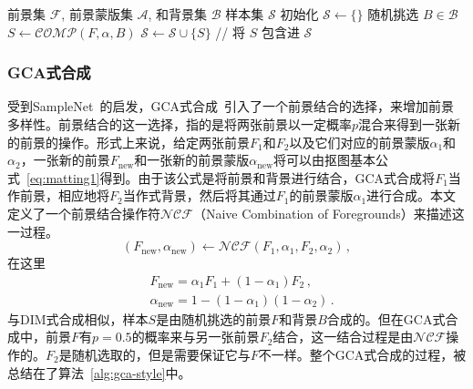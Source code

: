 \documentclass[supercite]{HustGraduPaper}
\begin{document}
	\begin{algorithm}[!t]
		\caption{DIM式合成} 
		\label{alg:dim-style} 
		\begin{algorithmic}
		\REQUIRE 前景集 $\mathcal{F}$, 前景蒙版集 $\mathcal{A}$, 和背景集 $\mathcal{B}$
		\ENSURE 样本集 $\mathcal{S}$
		\STATE 初始化 $\mathcal{S}\leftarrow\{\}$
			\STATE 随机挑选 $B\in\mathcal{B}$
			\STATE $S\leftarrow \mathcal{COMP}(F,\alpha,B)$
			\STATE $\mathcal{S}\leftarrow \mathcal{S} \cup \{S\}$ \textcolor{mygreen}{// 将 $S$ 包含进 $\mathcal{S}$}
			\ENDFOR
		\ENDFOR
		\end{algorithmic}
	\end{algorithm}
	
	\subsubsection{GCA式合成}
	受到SampleNet~\cite{LBSampling}的启发，GCA式合成~\cite{GCA}引入了一个前景结合的选择，来增加前景多样性。前景结合的这一选择，指的是将两张前景以一定概率$p$混合来得到一张新的前景的操作。形式上来说，给定两张前景$F_1$和$F_2$以及它们对应的前景蒙版$\alpha_1$和$\alpha_2$，一张新的前景$F_{\mathrm{new}}$和一张新的前景蒙版$\alpha_\mathrm{{new}}$将可以由抠图基本公式~\ref{eq:matting1}得到。由于该公式是将前景和背景进行结合，GCA式合成将$F_1$当作前景，相应地将$F_2$当作式背景，然后将其通过$F_1$的前景蒙版$\alpha_1$进行合成。本文定义了一个前景结合操作符$\mathcal{NCF}$（Naive Combination of Foregrounds）来描述这一过程。
	\begin{equation}
		(F_{\mathrm{new}},\alpha_{\mathrm{new}})\leftarrow\mathcal{NCF}(F_1,\alpha_1,F_2,\alpha_2)\,,
	\end{equation}
	在这里
	\begin{align}
		\label{eq:f_new_gca}
		&F_{\mathrm{new }}=\alpha_{1}F_1 + (1-\alpha_{1})F_2\,,\\
		\label{eq:alpha_new_gca}
		&\alpha_{\mathrm{new }}=1-(1-\alpha_{1})(1-\alpha_{2})\,.
	\end{align}
	与DIM式合成相似，样本$S$是由随机挑选的前景$F$和背景$B$合成的。但在GCA式合成中，前景$F$有$p=0.5$的概率来与另一张前景$F_2$结合，这一结合过程是由$\mathcal{NCF}$操作的。$F_2$是随机选取的，但是需要保证它与$F$不一样。整个GCA式合成的过程，被总结在了算法~\ref{alg:gca-style}中。
\end{document}
